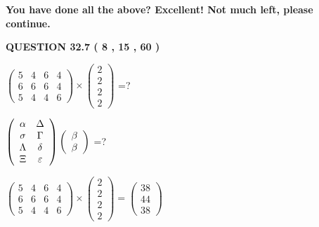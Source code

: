 \documentclass[12pt]{article}
\begin{document}
   
   
   
\vspace{0.3in}
{\textbf{\LARGE{You have done all the above? Excellent! Not much left, please continue.}}}
\vspace{0.3in}
   
   
  
\vspace{0.2in}
  
{\textbf{\Large{QUESTION
32.7 
 (           8 ,          15 ,          60 )
}}}
  
  
 
$ \left( \begin{array}{ccccccccc}
           5  & 
           4  & 
           6  & 
           4  \\ 
           6  & 
           6  & 
           6  & 
           4  \\ 
           5  & 
           4  & 
           4  & 
           6
\end{array}\right) \times
\left( \begin{array}{c}
           2  \\ 
           2  \\ 
           2  \\ 
           2
\end{array}\right) $ =?
 
 
$  %
 \left( \begin{array}
 {
 c
 c
 }
 \alpha & 
 \Delta \\ 
 \sigma & 
 \Gamma \\ 
 \Lambda & 
 \delta \\ 
                    \Xi & 
 \varepsilon
 \end{array} \right)
 \left( \begin{array}
 {
 c
 }
 \beta \\ 
 \beta
 \end{array} \right)
$ =?
 
 
 
\noindent{}
 
 

 
$\left( \begin{array}{ccccccccccccccc}
           5  & 
           4  & 
           6  & 
           4  \\ 
           6  & 
           6  & 
           6  & 
           4  \\ 
           5  & 
           4  & 
           4  & 
           6
\end{array}\right) \times
\left( \begin{array}{c}
           2  \\ 
           2  \\ 
           2  \\ 
           2
\end{array}\right)  =
\left( \begin{array}{c}
          38  \\ 
          44  \\ 
          38
\end{array}\right)  $
 
\end{document}
